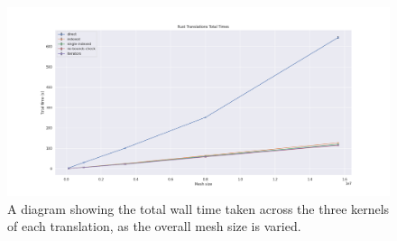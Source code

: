 \begin{figure}[H]
    \centering
    \includegraphics[width=\textwidth]{images/3_translation/performance/translations_total_line.png}
    \caption{A diagram showing the total wall time taken across the three kernels of each translation, as the overall mesh size is varied.}
    \label{fig:translations_total_line}
\end{figure}




